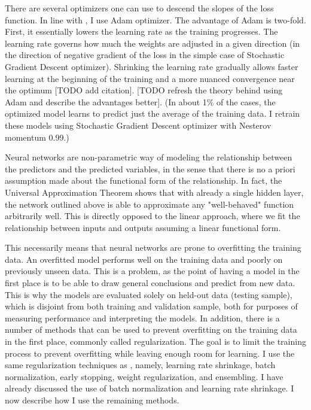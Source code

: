 		There are several optimizers one can use to descend the slopes of the loss function. In line with \cite{gu2020empirical}, I use Adam optimizer. The advantage of Adam is two-fold. First, it essentially lowers the learning rate as the training progresses. The learning rate governs how much the weights are adjusted in a given direction (in the direction of negative gradient of the loss in the simple case of Stochastic Gradient Descent optimizer). Shrinking the learning rate gradually allows faster learning at the beginning of the training and a more nuanced convergence near the optimum [TODO add citation]. [TODO refresh the theory behind using Adam and describe the advantages better]. (In about 1\% of the cases, the optimized model learns to predict just the average of the training data. I retrain these models using Stochastic Gradient Descent optimizer with Nesterov momentum 0.99.)
		
		Neural networks are non-parametric way of modeling the relationship between the predictors and the predicted variables, in the sense that there is no a priori assumption made about the functional form of the relationship. In fact, the Universal Approximation Theorem shows that with already a single hidden layer, the network outlined above is able to approximate any "well-behaved" function arbitrarily well. This is directly opposed to the linear approach, where we fit the relationship between inputs and outputs assuming a linear functional form. 
		
		This necessarily means that neural networks are prone to overfitting the training data. An overfitted model performs well on the training data and poorly on previously unseen data. This is a problem, as the point of having a model in the first place is to be able to draw general conclusions and predict from new data. This is why the models are evaluated solely on held-out data (testing sample), which is disjoint from both training and validation sample, both for purposes of measuring performance and interpreting the models. In addition, there is a number of methods that can be used to prevent overfitting on the training data in the first place, commonly called regularization. The goal is to limit the training process to prevent overfitting while leaving enough room for learning. I use the same regularization techniques as \cite{gu2020empirical}, namely, learning rate shrinkage, batch normalization, early stopping, weight regularization, and ensembling. I have already discussed the use of batch normalization and learning rate shrinkage. I now describe how I use the remaining methods. 
		
